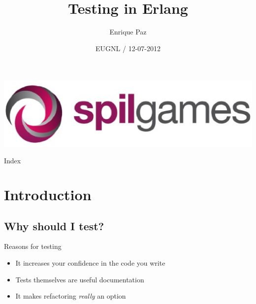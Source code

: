 \documentclass[pdf]{beamer}
\title[]{Testing in Erlang}
\author[] %
{Enrique Paz}
\institute[] %
{Senior Backend Developer @ Team Services}
\date[] %
{EUGNL / 12-07-2012}
\begin{document}
\begin{frame}
  \titlepage
  \includegraphics[scale=0.25]{images/SPILhorizontal.eps}
\end{frame}

\begin{frame}{Index}
  \tableofcontents
\end{frame}

\section{Introduction}

\subsection*{Why should I test?}
\label{why_should_i_test}

\begin{frame}{Reasons for testing}
    \begin{itemize}
    \item It increases your confidence in the code you write
    \pause
    \item Tests themselves are useful documentation
    \pause
    \item It makes refactoring \emph{really} an option
    \end{itemize}
\end{frame}
\end{document}
